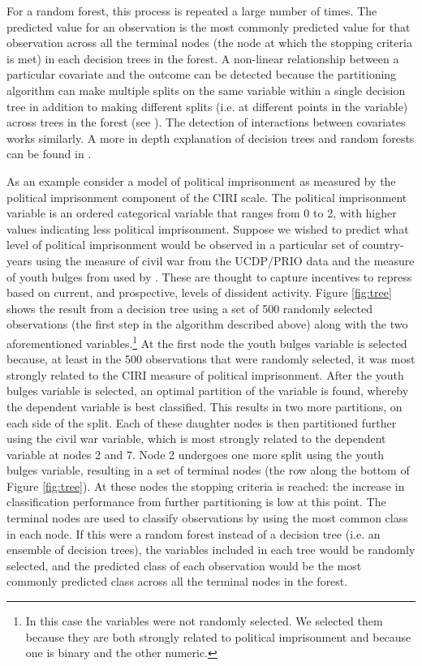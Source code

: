 \documentclass[11pt]{article}
\begin{document}
For a random forest, this process is repeated a large number of times. The predicted value for an observation is the most commonly predicted value for that observation across all the terminal nodes (the node at which the stopping criteria is met) in each decision trees in the forest.
A non-linear relationship between a particular covariate and the outcome can be detected because the partitioning algorithm can make multiple splits on the same variable within a single decision tree in addition to making different splits (i.e. at different points in the variable) across trees in the forest (see \citet{biau2008consistency}). The detection of interactions between covariates works similarly. A more in depth explanation of decision trees and random forests can be found in \citet{strobl2009introduction}. 

As an example consider a model of political imprisonment as measured by the political imprisonment component of the CIRI scale. The political imprisonment variable is an ordered categorical variable that ranges from 0 to 2, with higher values indicating less political imprisonment. Suppose we wished to predict what level of political imprisonment would be observed in a particular set of country-years using the measure of civil war from the UCDP/PRIO data \citep{ThemnerWallensteen2012} and the measure of youth bulges from \citet{Urdal2006} used by \citet{NordasDavenport2013}. These are thought to capture incentives to repress based on current, and prospective, levels of dissident activity. Figure \ref{fig:tree} shows the result from a decision tree using a set of 500 randomly selected observations (the first step in the algorithm described above) along with the two aforementioned variables.\footnote{In this case the variables were not randomly selected. We selected them because they are both strongly related to political imprisonment and because one is binary and the other numeric.} At the first node the youth bulges variable is selected because, at least in the 500 observations that were randomly selected, it was most strongly related to the CIRI measure of political imprisonment. After the youth bulges variable is selected, an optimal partition of the variable is found, whereby the dependent variable is best classified. This results in two more partitions, on each side of the split. Each of these daughter nodes is then partitioned further using the civil war variable, which is most strongly related to the dependent variable at nodes 2 and 7. Node 2 undergoes one more split using the youth bulges variable, resulting in a set of terminal nodes (the row along the bottom of Figure \ref{fig:tree}). At these nodes the stopping criteria is reached: the increase in classification performance from further partitioning is low at this point. The terminal nodes are used to classify observations by using the most common class in each node. If this were a random forest instead of a decision tree (i.e. an ensemble of decision trees), the variables included in each tree would be randomly selected, and the predicted class of each observation would be the most commonly predicted class across all the terminal nodes in the forest.
\end{document}
